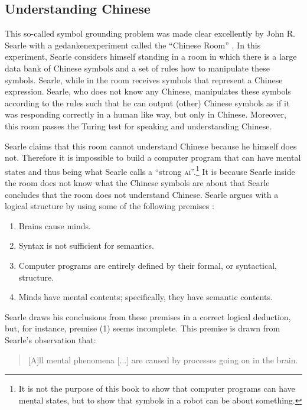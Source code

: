 \subsection{Understanding Chinese}This so-called symbol grounding problem was made clear excellently by John R. Searle with a gedankenexperiment called the ``Chinese Room'' \citep{searle:1980}. In this experiment, Searle considers himself standing in a room in which there is a large data bank of Chinese symbols and a set of rules how to manipulate these symbols. Searle, while in the room receives symbols that represent a Chinese expression. Searle, who does not know any Chinese, manipulates these symbols according to the rules such that he can output (other) Chinese symbols as if it was responding correctly in a human like way, but only in Chinese. Moreover, this room passes the Turing test for speaking and understanding Chinese.

Searle claims that this room cannot understand Chinese because he himself does not. Therefore it is impossible to build a computer program that can have mental states and thus being what Searle calls a ``strong {\scshape ai}''.\footnote{It is not the purpose of this book to show that computer programs can have mental states, but to show that symbols in a robot can be about something.} It is because Searle inside the room does not know what the Chinese symbols are about that Searle concludes that the room does not understand Chinese. Searle argues with a logical structure by using some of the following premises \citep[39]{searle:1984}:

\begin{enumerate}[label=(\arabic*)]
\item Brains cause minds.
\item Syntax is not sufficient for semantics.
\item Computer programs are entirely defined by their formal, or syntactical, structure.
\item Minds have mental contents; specifically, they have semantic contents.
\end{enumerate}

Searle draws his conclusions from these premises in a correct logical deduction, but, for instance, premise (1) seems incomplete. This premise is drawn from Searle's observation that:

\begin{quote}
[A]ll mental phenomena [...] are caused by processes going on in the brain. \citep[18]{searle:1984}
\end{quote}

